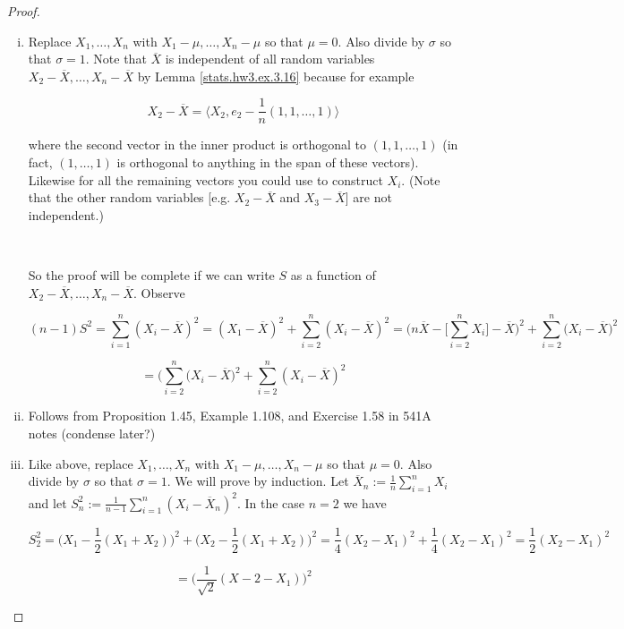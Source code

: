 \begin{proof}

\begin{enumerate}[(i)]

\item Replace \(X_1, \ldots, X_n\) with \(X_1 - \mu, \ldots, X_n - \mu\) so that \(\mu = 0\). Also divide by \(\sigma\) so that \(\sigma=1\). Note that \(\overline{X}\) is independent of all random variables \(X_2 - \overline{X}, \ldots, X_n - \overline{X}\) by Lemma \ref{stats.hw3.ex.3.16} because for example

\[
X_2 - \overline{X} = \langle X_2, e_2 - \frac{1}{n} (1, 1, \ldots, 1) \rangle
\]

where the second vector in the inner product is orthogonal to \((1, 1, \ldots, 1 )\) (in fact, \((1, \ldots, 1)\) is orthogonal to anything in the span of these vectors). Likewise for all the remaining vectors you could use to construct \(X_i\). (Note that the other random variables [e.g. \(X_2 - \overline{X}\) and \(X_3 - \overline{X}\)] are not independent.)

\

So the proof will be complete if we can write \(S\) as a function of \(X_2 - \overline{X}, \ldots, X_n - \overline{X}\). Observe

\[
(n-1)S^2 = \sum_{i=1}^n (X_i - \overline{X})^2 = (X_1 - \overline{X})^2 + \sum_{i=2}^n (X_i - \overline{X})^2 = \bigg( n \overline{X} - \bigg[ \sum_{i=2}^n X_i \bigg] - \overline{X} \bigg) ^2 + \sum_{i=2}^n \bigg( X_i - \overline{X} \bigg)^2 
\]

\[
= \bigg(\sum_{i=2}^n (X_i - \overline{X}  \bigg)^2 + \sum_{i=2}^n (X_i - \overline{X})^2 
\]

\item Follows from Proposition 1.45, Example 1.108, and Exercise 1.58 in 541A notes (condense later?)

\item Like above, replace \(X_1, \ldots, X_n\) with \(X_1 - \mu, \ldots, X_n - \mu\) so that \(\mu = 0\). Also divide by \(\sigma\) so that \(\sigma=1\). We will prove by induction. Let \(\overline{X}_n:= \frac{1}{n} \sum_{i=1}^n X_i\) and let \(S_n^2 := \frac{1}{n-1} \sum_{i=1}^n (X_i - \overline{X}_n)^2\). In the case \(n=2\) we have

\[
S_2^2 = \bigg(X_1 - \frac{1}{2}(X_1 + X_2) \bigg)^2 + \bigg(X_2 - \frac{1}{2}(X_1 + X_2) \bigg)^2 = \frac{1}{4}(X_2 - X_1)^2 + \frac{1}{4}(X_2 - X_1)^2 = \frac{1}{2}(X_2 - X_1)^2 
\]

\[
= \bigg( \frac{1}{\sqrt{2}} (X-2 - X_1) \bigg)^2
\]


\end{enumerate}
\end{proof}
